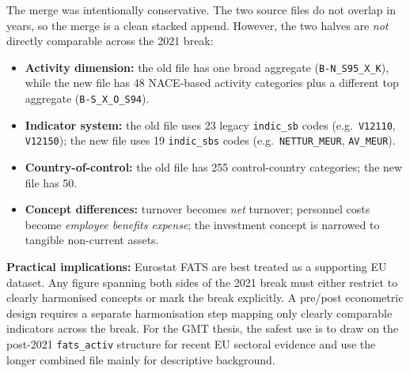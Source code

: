 \documentclass[11pt,a4paper]{article}
\begin{document}
The merge was intentionally conservative.  The two source files do not overlap
in years, so the merge is a clean stacked append.  However, the two halves are
\emph{not} directly comparable across the 2021 break:

\begin{itemize}[noitemsep]
    \item \textbf{Activity dimension:} the old file has one broad aggregate
    (\texttt{B-N\_S95\_X\_K}), while the new file has 48 NACE-based activity
    categories plus a different top aggregate (\texttt{B-S\_X\_O\_S94}).
    \item \textbf{Indicator system:} the old file uses 23 legacy
    \texttt{indic\_sb} codes (e.g.\ \texttt{V12110}, \texttt{V12150}); the new
    file uses 19 \texttt{indic\_sbs} codes (e.g.\ \texttt{NETTUR\_MEUR},
    \texttt{AV\_MEUR}).
    \item \textbf{Country-of-control:} the old file has 255 control-country
    categories; the new file has 50.
    \item \textbf{Concept differences:} turnover becomes \emph{net} turnover;
    personnel costs become \emph{employee benefits expense}; the investment
    concept is narrowed to tangible non-current assets.
\end{itemize}

\noindent\textbf{Practical implications:} Eurostat FATS are best treated as a
supporting EU dataset.  Any figure spanning both sides of the 2021 break must
either restrict to clearly harmonised concepts or mark the break explicitly.  A
pre/post econometric design requires a separate harmonisation step mapping only
clearly comparable indicators across the break.  For the GMT thesis, the safest
use is to draw on the post-2021 \texttt{fats\_activ} structure for recent EU
sectoral evidence and use the longer combined file mainly for descriptive
background.


\newpage
\printbibliography %
\end{document}
